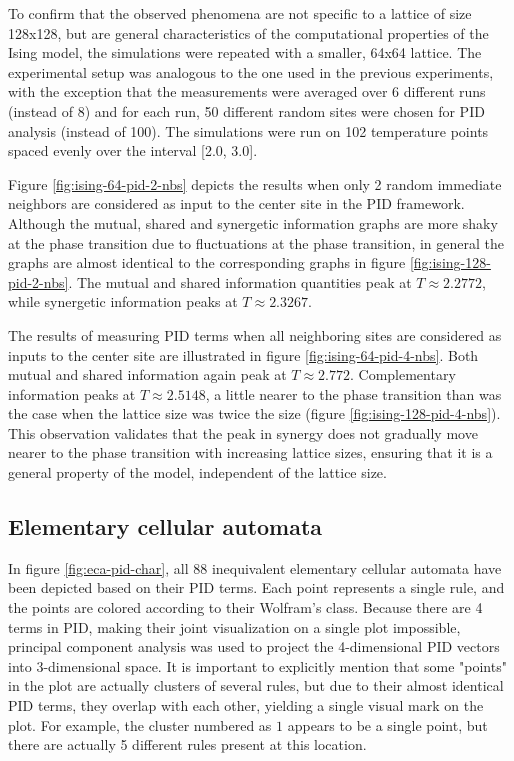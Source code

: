 \documentclass[12pt]{article}
\begin{document}
To confirm that the observed phenomena are not specific to a lattice of size 128x128, but are general characteristics of the computational properties of the Ising model, the simulations were repeated with a smaller, 64x64 lattice. The experimental setup was analogous to the one used in the previous experiments, with the exception that the measurements were averaged over 6 different runs (instead of 8) and for each run, 50 different random sites were chosen for PID analysis (instead of 100). The simulations were run on 102 temperature points spaced evenly over the interval [2.0, 3.0].

Figure \ref{fig:ising-64-pid-2-nbs} depicts the results when only 2 random immediate neighbors are considered as input to the center site in the PID framework. Although the mutual, shared and synergetic information graphs are more shaky at the phase transition due to fluctuations at the phase transition, in general the graphs are almost identical to the corresponding graphs in figure \ref{fig:ising-128-pid-2-nbs}. The mutual and shared information quantities peak at $T \approx 2.2772$, while synergetic information peaks at $T \approx 2.3267$.

The results of measuring PID terms when all neighboring sites are considered as inputs to the center site are illustrated in figure \ref{fig:ising-64-pid-4-nbs}. Both mutual and shared information again peak at $T \approx 2.772$. Complementary information peaks at $T \approx 2.5148$, a little nearer to the phase transition than was the case when the lattice size was twice the size (figure \ref{fig:ising-128-pid-4-nbs}). This observation validates that the peak in synergy does not gradually move nearer to the phase transition with increasing lattice sizes, ensuring that it is a general property of the model, independent of the lattice size.

\subsection{Elementary cellular automata}

In figure \ref{fig:eca-pid-char}, all 88 inequivalent elementary cellular automata have been depicted based on their PID terms. Each point represents a single rule, and the points are colored according to their Wolfram's class. Because there are 4 terms in PID, making their joint visualization on a single plot impossible, principal component analysis was used to project the 4-dimensional PID vectors into 3-dimensional space. It is important to explicitly mention that some "points" in the plot are actually clusters of several rules, but due to their almost identical PID terms, they overlap with each other, yielding a single visual mark on the plot.  For example, the cluster numbered as $1$ appears to be a single point, but there are actually 5 different rules present at this location.   
\end{document}
